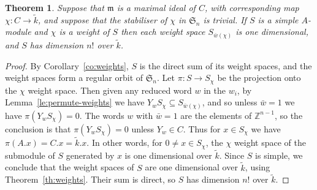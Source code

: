 \documentclass[12pt]{amsart}
\newcommand{\sym}[1]{\mathfrak{S}_{#1}}
\newcommand{\bZ}{{\mathbb{Z}}}
\newcommand{\mfm}{\mathfrak{m}}
\numberwithin{equation}{section}
\newtheorem{theorem}[equation]{Theorem}
\theoremstyle{definition}
\begin{document}
\begin{theorem}\label{th:n!}
Suppose that $\mfm$ is a maximal ideal  of $C$,
with corresponding map 
$\chi\colon C\to \tilde k$, and suppose that the stabiliser of $\chi$
in $\sym{n}$ is trivial. If $S$ is a simple $A$-module and $\chi$ is a weight of $S$
then each weight space $S_{\bar w(\chi)}$ is one dimensional, and $S$ has
dimension $n!$ over $\tilde k$.
\end{theorem}
\begin{proof}
By Corollary~\ref{co:weights}, $S$ is the direct sum of its weight
spaces, and the weight spaces form a regular orbit of $\sym{n}$.
Let $\pi\colon S \to S_{\chi}$ be the projection onto the $\chi$
weight space. Then
given any reduced word $w$ in the $w_i$, by
Lemma~\ref{le:permute-weights} we have $Y_wS_\chi\subseteq S_{\bar
  w(\chi)}$, and so unless $\bar w=1$ we have $\pi(Y_wS_\chi)=0$.
The words $w$ with $\bar w=1$ are the elements of $\bZ^{n-1}$, so the
conclusion is that $\pi(Y_wS_\chi)=0$ unless $Y_w\in C$. Thus
for $x\in S_\chi$ we have $\pi(A.x)=C.x=\tilde k.x$.
In other words, for $0\ne x\in S_\chi$, the $\chi$ weight space of the submodule of $S$
generated by $x$ is one dimensional over $\tilde k$. Since $S$ is
simple, we conclude that the weight spaces of $S$ are one dimensional
over $\tilde k$, using Theorem~\ref{th:weights}. Their sum is direct, so $S$ has dimension $n!$ over
$\tilde k$.
\end{proof}
\end{document}
